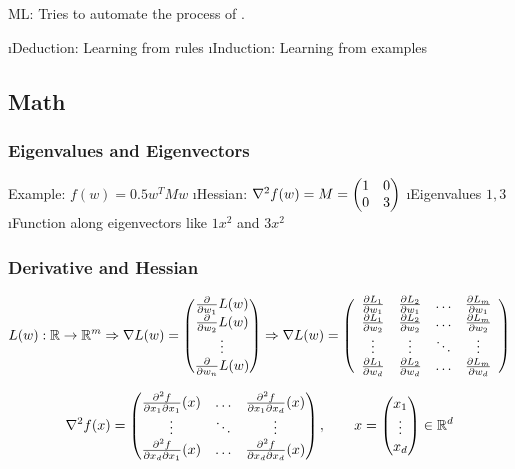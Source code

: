 
ML: Tries to automate the process of .

\be
\i Deduction: Learning from rules
\i Induction: Learning from examples
\ee

\subsection{Math}


\subsubsection{Eigenvalues and Eigenvectors}

Example: $f(w) = 0.5 w^TMw$
\bi
\i Hessian: $\nabla^2 f(w) = M = \begin{pmatrix} 1 & 0 \\ 0 & 3 \end{pmatrix}$
\i Eigenvalues $1,3$
\i Function along eigenvectors like $1x^2$ and $3x^2$
\ei

\subsubsection{Derivative and Hessian}

\newcommand{\dlw}[2]{\frac{\partial L_#1}{\partial w_#2}}
\begin{align*}
L(w): \RS \to \RS^m
\Rightarrow  \nabla L(w) = \vct{\drv{w_1}L(w)\\\drv{w_2}L(w)\\\vdots\\\drv{w_n}L(w)}
\Rightarrow \nabla L(w) = \left(\begin{array}{cccc}
\dlw{1}{1} & \dlw{2}{1} & \ldots & \dlw{m}{1} \\
\dlw{1}{2} & \dlw{2}{2} & \ldots & \dlw{m}{2} \\
\vdots & \vdots & \ddots & \vdots \\
\dlw{1}{d} & \dlw{2}{d} & \ldots & \dlw{m}{d}
\end{array}\right)
\end{align*}

\newcommand{\dfdx}[2]{
    \frac{\partial^2 f}{\partial x_{#1} \partial x_{#2}} (x)
}
\begin{align*}
\nabla^2 f(x) =
\vct{
    \dfdx{1}{1} & \ldots & \dfdx{1}{d} \\
    \vdots & \ddots & \vdots \\
    \dfdx{d}{1} & \ldots & \dfdx{d}{d} 
}, \qquad x = \vct{x_1\\\vdots\\x_d} \in \RS^d
\end{align*}

